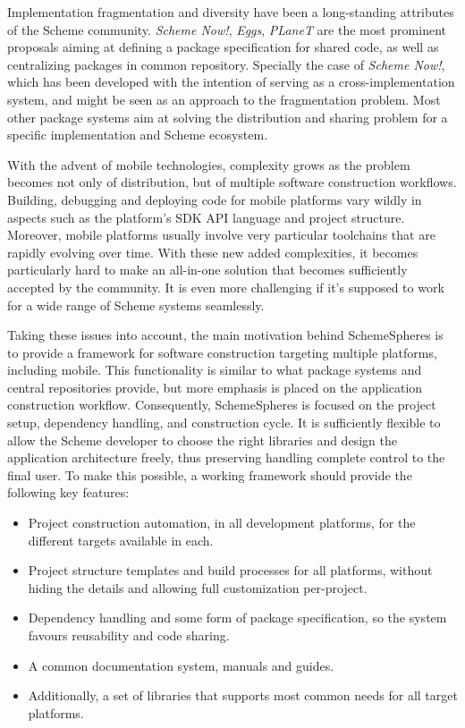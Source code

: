 \documentclass{acm_proc_article-sp}
\begin{document}
Implementation fragmentation and diversity have been a long-standing attributes of the Scheme community. \textit{Scheme Now!}, \textit{Eggs}, \textit{PLaneT} are the most prominent proposals aiming at defining a package specification for shared code, as well as centralizing packages in common repository. Specially the case of \textit{Scheme Now!}, which has been developed with the intention of serving as a cross-implementation system, and might be seen as an approach to the fragmentation problem. Most other package systems aim at solving the distribution and sharing problem for a specific implementation and Scheme ecosystem.

With the advent of mobile technologies, complexity grows as the problem becomes not only of distribution, but of multiple software construction workflows. Building, debugging and deploying code for mobile platforms vary wildly in aspects such as the platform's SDK API language and project structure. Moreover, mobile platforms usually involve very particular toolchains that are rapidly evolving over time. With these new added complexities, it becomes particularly hard to make an all-in-one solution that becomes sufficiently accepted by the community. It is even more challenging if it's supposed to work for a wide range of Scheme systems seamlessly.

Taking these issues into account, the main motivation behind SchemeSpheres is to provide a framework for software construction targeting multiple platforms, including mobile. This functionality is similar to what package systems and central repositories provide, but more emphasis is placed on the application construction workflow. Consequently, SchemeSpheres is focused on the project setup, dependency handling, and construction cycle. It is sufficiently flexible to allow the Scheme developer to choose the right libraries and design the application architecture freely, thus preserving handling complete control to the final user. To make this possible, a working framework should provide the following key features:

\begin{itemize}
  \item Project construction automation, in all development platforms, for the different targets available in each.
  \item Project structure templates and build processes for all platforms, without hiding the details and allowing full customization per-project.
  \item Dependency handling and some form of package specification, so the system favours reusability and code sharing.
  \item A common documentation system, manuals and guides.
  \item Additionally, a set of libraries that supports most common needs for all target platforms.
\end{itemize}
\end{document}
